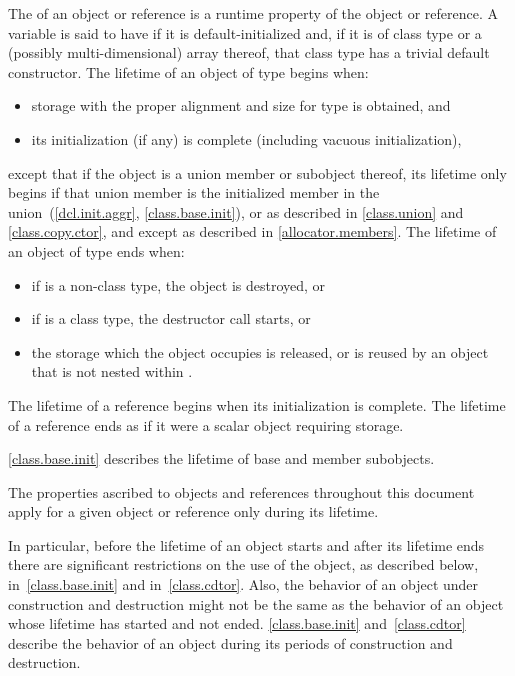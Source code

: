 \pnum
{}%
The  of an object or reference is a runtime property of the
object or reference.
%
A variable is said to have 
if it is default-initialized and,
if it is of class type or a (possibly multi-dimensional) array thereof,
that class type has a trivial default constructor.
The lifetime of an object of type  begins when:
\begin{itemize}
\item storage with the proper alignment and size
  for type  is obtained, and
\item its initialization (if any) is complete
  (including vacuous initialization),
\end{itemize}
except that if the object is a union member or subobject thereof,
its lifetime only begins if that union member is the
initialized member in the union~(\ref{dcl.init.aggr}, \ref{class.base.init}),
or as described in \ref{class.union} and \ref{class.copy.ctor},
and except as described in \ref{allocator.members}.
The lifetime of an object  of type  ends when:
\begin{itemize}
\item if  is a non-class type, the object is destroyed, or
\item if  is a class type, the destructor call starts, or
\item the storage which the object occupies is released,
or is reused by an object that is not nested within .
\end{itemize}

\pnum
{}%
The lifetime of a reference begins when its initialization is complete.
The lifetime of a reference ends as if it were a scalar object requiring storage.

\pnum
\begin{note}
\ref{class.base.init}
describes the lifetime of base and member subobjects.
\end{note}

\pnum
The properties ascribed to objects and references throughout this document
apply for a given object or reference only during its lifetime.
\begin{note}
In particular, before the lifetime of an object starts and after its
lifetime ends there are significant restrictions on the use of the
object, as described below, in~\ref{class.base.init} and
in~\ref{class.cdtor}. Also, the behavior of an object under construction
and destruction might not be the same as the behavior of an object whose
lifetime has started and not ended. \ref{class.base.init}
and~\ref{class.cdtor} describe the behavior of an object during its periods
of construction and destruction.
\end{note}

